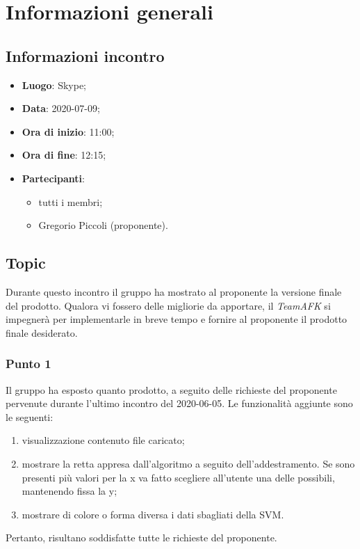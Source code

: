 \section{Informazioni generali}
\subsection{Informazioni incontro}
\begin{itemize}
	\item \textbf{Luogo}: Skype;
	\item \textbf{Data}: 2020-07-09;
	\item \textbf{Ora di inizio}: 11:00;
	\item \textbf{Ora di fine}: 12:15;
	\item \textbf{Partecipanti}:
	\begin{itemize}
		\item tutti i membri;
		\item Gregorio Piccoli (proponente).
	\end{itemize}
\end{itemize}

\subsection{Topic}
Durante questo incontro il gruppo ha mostrato al proponente la versione finale del prodotto. Qualora vi fossero delle migliorie da apportare, il \textit{TeamAFK} si impegnerà per implementarle in breve tempo e fornire al proponente il prodotto finale desiderato.

\subsubsection{Punto 1}
Il gruppo ha esposto quanto prodotto, a seguito delle richieste del proponente pervenute durante l'ultimo incontro del 2020-06-05. 
Le funzionalità aggiunte sono le seguenti:
\begin{enumerate}
\item visualizzazione contenuto file caricato;
\item mostrare la retta appresa dall’algoritmo a seguito dell’addestramento. Se sono presenti più valori per la x va fatto scegliere all’utente una delle possibili, mantenendo fissa la y;
\item mostrare di colore o forma diversa i dati sbagliati della SVM.
\end{enumerate}
Pertanto, risultano soddisfatte tutte le richieste del proponente.

